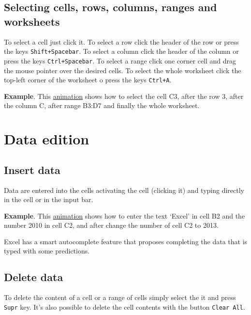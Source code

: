 \subsection{Selecting cells, rows, columns, ranges and worksheets}\hypertarget{selecting-cells-rows-columns-ranges-and-worksheets}{}\label{selecting-cells-rows-columns-ranges-and-worksheets}

To select a cell just click it. 
To select a row click the header of the row or press the keys \texttt{Shift+Spacebar}. 
To select a column click the header of the column or press the keys \texttt{Ctrl+Spacebar}.
To select a range click one corner cell and drag the mouse pointer over the desired cells. 
To select the whole worksheet click the top-left corner of the worksheet o press the keys \texttt{Ctrl+A}.

\textbf{Example}.  This \href{http://aprendeconalf.es/office/excel/manual/img/example_cells_selection.gif}{animation} shows how to select the cell C3, after the row 3, after the column C, after range B3:D7 and finally the whole worksheet.

\section{Data edition}\hypertarget{data-edition}{}\label{data-edition}

\subsection{Insert data}\hypertarget{insert-data}{}\label{insert-data}

Data are entered into the cells activating the cell (clicking it) and typing directly in the cell or in the input bar.

\textbf{Example}.  This \href{http://aprendeconalf.es/office/excel/manual/img/example_enter_data.gif}{animation} shows how to enter the text `Excel' in cell B2 and the number 2010 in cell C2, and after change the number of cell C2 to 2013.

Excel has a smart autocomplete feature that proposes completing the data that is typed with some predictions.

\subsection{Delete data}\hypertarget{delete-data}{}\label{delete-data}

To delete the content of a cell or a range of cells simply select the it and press \texttt{Supr} key. It's also possible to delete the cell contents with the button \texttt{Clear All}.

